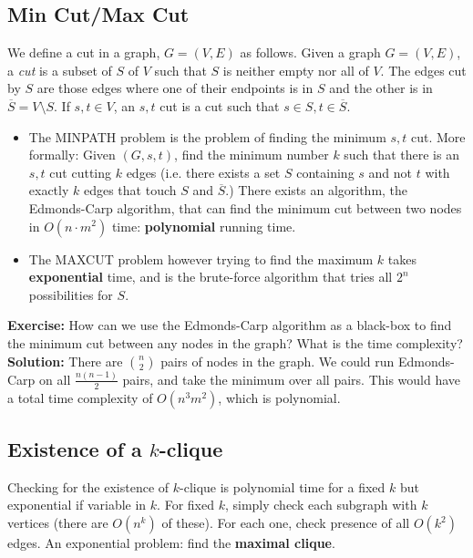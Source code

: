 \documentclass[11pt]{article}
\theoremstyle{definition}
\theoremstyle{remark}
\begin{document}
\subsection{Min Cut/Max Cut}
We define a cut in a graph, $G = (V, E)$ as follows. Given a graph $G=(V, E)$, a \textit{cut} is a subset of $S$ of $V$ such that $S$ is neither empty nor all of $V$. The edges cut by $S$ are those edges where one of their endpoints is in $S$ and the other is in $\overline{S}=V \setminus S.$ If $s, t \in V$, an $s, t$ cut is a cut such that $s \in S, t \in \overline{S}.$

\begin{itemize}
\item The \textsf{MINPATH} problem is the problem of finding the minimum $s, t$ cut. More formally: Given $(G, s, t)$, find the minimum number $k$ such that there is an $s, t$ cut cutting $k$ edges (i.e. there exists a set $S$ containing $s$ and not $t$ with exactly $k$ edges that touch $S$ and $\overline{S}.$) There exists an algorithm, the Edmonds-Carp algorithm, that can find the minimum cut between two nodes in $O(n\cdot m^2)$ time: \textbf{polynomial} running time. 

\item The \textsf{MAXCUT} problem however trying to find the maximum $k$ takes \textbf{exponential} time, and is the brute-force algorithm that tries all $2^n$ possibilities for $S$.

\end{itemize}


\noindent \textbf{Exercise:} How can we use the Edmonds-Carp algorithm as a black-box to find the minimum cut between any nodes in the graph? What is the time complexity?\\

\noindent \textbf{Solution:} There are $n \choose 2$ pairs of nodes in the graph. We could run Edmonds-Carp on all $\frac{n(n-1)}{2}$ pairs, and take the minimum over all pairs. This would have a total time complexity of $O(n^3m^2)$, which is polynomial.


\subsection{Existence of a $k$-clique}

\noindent Checking for the existence of $k$-clique is polynomial time for a fixed 
$k$ but exponential if variable in $k$. For fixed $k$, simply check each subgraph
with $k$ vertices (there are $O(n^k)$ of these). For each one, check presence of 
all $O(k^2)$ edges. An exponential problem: find the \textbf{maximal clique}.
\end{document}
